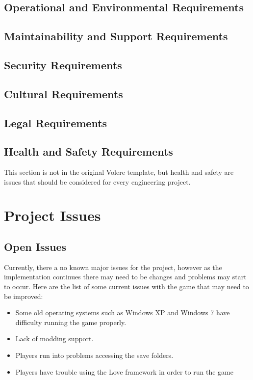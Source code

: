 \documentclass[12pt, titlepage]{article}
\begin{document}
\subsection{Operational and Environmental Requirements}

\subsection{Maintainability and Support Requirements}

\subsection{Security Requirements}

\subsection{Cultural Requirements}

\subsection{Legal Requirements}

\subsection{Health and Safety Requirements}

This section is not in the original Volere template, but health and safety are
issues that should be considered for every engineering project.

\section{Project Issues}

\subsection{Open Issues}
Currently, there a no known major issues for the project, however as the implementation continues there may need to be changes and problems may start to occur. 
Here are the list of some current issues with the game that may need to be improved:
\begin{itemize}
\item Some old operating systems such as Windows XP and Windows 7 have difficulty running the game properly.
\item Lack of modding support.
\item Players run into problems accessing the save folders.
\item Players have trouble using the Love framework in order to run the game
\end{itemize}
\end{document}
